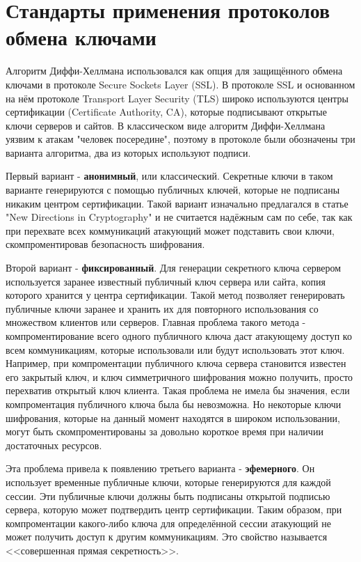 \documentclass[times,specification,annotation]{itmo-student-thesis}
\begin{document}
\section{Стандарты применения протоколов обмена ключами}\label{sec:IETF}

Алгоритм Диффи-Хеллмана использовался как опция для защищённого обмена ключами в протоколе Secure Sockets Layer (SSL).
В протоколе SSL и основанном на нём протоколе Transport Layer Security (TLS) широко используются центры сертификации
(Certificate Authority, CA), которые подписывают открытые ключи серверов и сайтов.
В классическом виде алгоритм Диффи-Хеллмана уязвим к атакам "человек посередине", поэтому в протоколе были
обозначены три варианта алгоритма, два из которых используют подписи.

Первый вариант - \textbf{анонимный}, или классический. Секретные ключи в таком варианте генерируются с помощью публичных
ключей, которые не подписаны никаким центром сертификации.
Такой вариант изначально предлагался в статье "New Directions in Cryptography" и не считается надёжным сам по себе,
так как при перехвате всех коммуникаций атакующий может подставить свои ключи, скомпроментировав безопасность шифрования.

Второй вариант - \textbf{фиксированный}. Для генерации секретного ключа сервером используется заранее известный публичный ключ
сервера или сайта, копия которого хранится у центра сертификации.
Такой метод позволяет генерировать публичные ключи заранее и хранить их для повторного использования со множеством клиентов или серверов.
Главная проблема такого метода - компроментирование всего одного публичного ключа даст атакующему доступ
ко всем коммуникациям, которые использовали или будут использовать этот ключ.
Например, при компроментации публичного ключа сервера становится известен его закрытый ключ, и ключ
симметричного шифрования можно получить, просто перехватив открытый ключ клиента.
Такая проблема не имела бы значения, если компроментация публичного ключа была бы невозможна.
Но некоторые ключи шифрования, которые на данный момент находятся в широком использовании, могут быть скомпроментированы
за довольно короткое время при наличии достаточных ресурсов.

Эта проблема привела к появлению третьего варианта - \textbf{эфемерного}.
Он использует временные публичные ключи, которые генерируются для каждой сессии.
Эти публичные ключи должны быть подписаны открытой подписью сервера, которую может подтвердить
центр сертификации.
Таким образом, при компроментации какого-либо ключа для определённой сессии атакующий не может получить
доступ к другим коммуникациям.
Это свойство называется <<совершенная прямая секретность>>.
\end{document}
